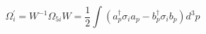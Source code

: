 \begin{equation}
\Omega_{i}^{'} = W^{-1} \Omega_{5i} W = \frac{1}{2} 
\int (a_{p}^{\dag} \sigma_{i} a_{p} - b_{p}^{\dag} \sigma_{i} b_{p})d^{3}p 
\end{equation}

